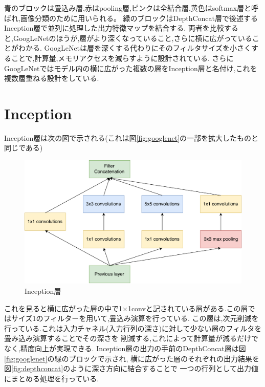 {%
青のブロックは畳込み層,赤はpooling層,ピンクは全結合層,黄色はsoftmax層と呼ばれ,画像分類のために用いられる。
緑のブロックはDepthConcat層で後述するInception層で並列に処理した出力特徴マップを結合する.
両者を比較すると,GoogLeNetのほうが,層がより深くなっていること,さらに横に広がっていることがわかる.
GoogLeNetは層を深くする代わりにそのフィルタサイズを小さくすることで,計算量,メモリアクセスを減らすように設計されている.
さらにGoogLeNetではモデル内の横に広がった複数の層をInception層と名付け,これを複数層重ねる設計をしている.

\section{Inception}
\label{sec:inception}
Inception層は次の図で示される(これは図\ref{fig:googlenet}の一部を拡大したものと同じである)

\begin{figure}[h]
  \centering
  \includegraphics[scale=0.5]{./chap2/fig/inception.pdf}
  \caption{Inception層}
  \label{fig:inception}
\end{figure}

これを見ると横に広がった層の中で1$\times$1convと記されている層がある.この層ではサイズ1のフィルターを用いて,畳込み演算を行っている.
この層は,次元削減を行っている.これは入力チャネル(入力行列の深さ)に対して少ない層のフィルタを畳み込み演算することでその深さを
削減する,これによって計算量が減るだけでなく,精度向上が実現できる.
Inception層の出力の手前のDepthConcat層は図\ref{fig:googlenet}の緑のブロックで示され,
横に広がった層のそれぞれの出力結果を図\ref{fig:depthconcat}のように深さ方向に結合することで
一つの行列として出力値にまとめる処理を行っている.

}
